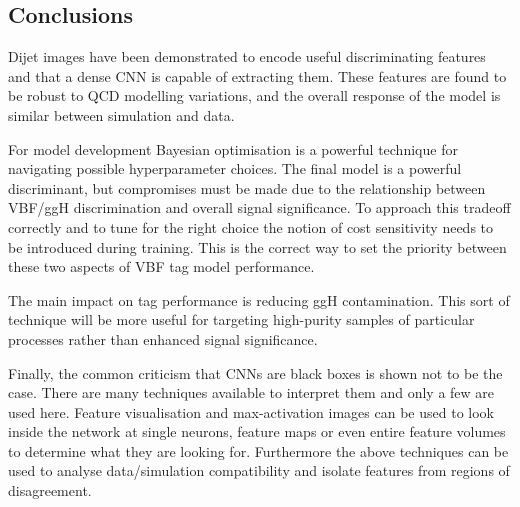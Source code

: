 \subsection{Conclusions}
Dijet images have been demonstrated to encode useful discriminating features and that a dense CNN is capable of extracting them. These features are found to be robust to QCD modelling variations, and the overall response of the model is similar between simulation and data. 

For model development Bayesian optimisation is a powerful technique for navigating possible hyperparameter choices. The final model is a powerful discriminant, but compromises must be made due to the relationship between VBF/ggH discrimination and overall signal significance. 
To approach this tradeoff correctly and to tune for the right choice the notion of cost sensitivity needs to be introduced during training. This is the correct way to set the priority between these two aspects of VBF tag model performance. 

The main impact on tag performance is reducing ggH contamination. This sort of technique will be more useful for targeting high-purity samples of particular processes rather than enhanced signal significance. 

Finally, the common criticism that CNNs are black boxes is shown not to be the case. There are many techniques available to interpret them and only a few are used here. Feature visualisation and max-activation images can be used to look inside the network at single neurons, feature maps or even entire feature volumes to determine what they are looking for. 
Furthermore the above techniques can be used to analyse data/simulation compatibility and isolate features from regions of disagreement. 



